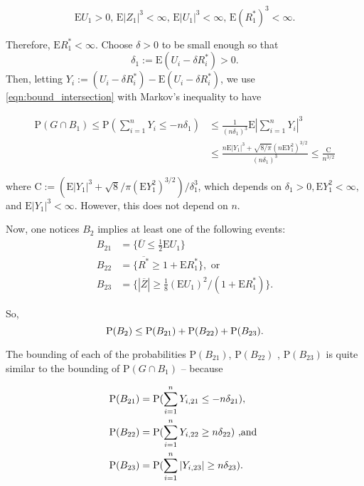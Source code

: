 \[
\mathrm{E}U_{1}>0,\, \mathrm{E}|Z_{1}|^{3}<\infty,\, \mathrm{E}|U_{1}|^{3}<\infty,\, \mathrm{E}(R_{1}^{*})^{3}<\infty.
\]

Therefore, $\mathrm{E}R_{1}^{*}<\infty$. Choose $\delta>0$ to be small enough so that
$$
\delta_{1}:=\mathrm{E}(U_{i}-\delta R_{i}^{*})>0.
$$
Then, letting $Y_{i} :=(U_{i}-\delta R_{i}^{*})-\mathrm{E}(U_{i}-\delta R_{i}^{*})$, we use \eqref{eqn:bound_intersection} with Markov's inequality to have

\begin{align*}
\mathrm{P}(G\cap B_{1})\leq \mathrm{P}(\sum_{i=1}^{n}Y_{i}\leq-n\delta_{1})&\leq\frac{1}{(n\delta_{1})^{3}}\mathrm{E}|\sum_{i=1}^{n}Y_{i}|^{3}
\\
&\leq\frac{n\mathrm{E}|Y_{1}|^{3}+\sqrt{8/\pi}(n\mathrm{E}Y_{1}^{2})^{3/2}}{(n\delta_{1})^{3}}\leq\frac{\mathrm{C}}{n^{3/2}}
\end{align*}

where $\mathrm{C}:=(\mathrm{E}|Y_{1}|^{3}+\sqrt{8}/\pi(\mathrm{E}Y_{1}^{2})^{3/2})/\delta_{1}^{3}$, which depends on $\delta_{1}>0, \mathrm{E}Y_{1}^{2}<\infty,$ and $\mathrm{E}|Y_{1}|^{3}<\infty$. However, this does not depend on $n$.

Now, one notices $B_{2}$ implies at least one of the following events:
\begin{align*}
B_{21} &=\displaystyle\{\overline{U}\leq\frac{1}{2}\mathrm{E}U_{1}\} \\
B_{22} &=\{\overline{R^{*}}\geq 1+\mathrm{E}R_{1}^{*}\}, \textrm{ or}\\ 
B_{23} &= \displaystyle \{|\overline{Z}|\geq\frac{1}{8}(\mathrm{E}U_{1})^{2}/(1+\mathrm{E}R_{1}^{*})\}. 
\end{align*}

So,
\begin{equation}
\mathrm{P}(B_{2})\leq \mathrm{P}(B_{21})+\mathrm{P}(B_{22})+\mathrm{P}(B_{23}).
\end{equation}

The bounding of each of the probabilities $\mathrm{P}(B_{21})$, $\mathrm{P}(B_{22})$ , $\mathrm{P}(B_{23})$ is quite similar to the bounding of $\mathrm{P}(G\cap B_{1})$ -- because 

\begin{align*}
\mathrm{P}(B_{21})&=\mathrm{P}(\sum_{i=1}^{n}Y_{i,21}\leq-n\delta_{21}), \\
\mathrm{P}(B_{22})&=\mathrm{P}(\sum_{i=1}^{n}Y_{i,22}\geq n\delta_{22}) \textrm{ ,and } \\ 
\mathrm{P}(B_{23})&= \mathrm{P}(\sum_{i=1}^{n}|Y_{i,23}|\geq n\delta_{23}).
\end{align*} 

